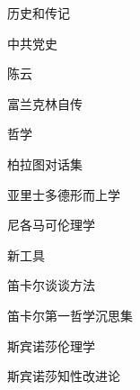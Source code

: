 历史和传记
\begin{enumbox} 
\item 中共党史
\item 陈云
\item 富兰克林自传
\end{enumbox} 

哲学
\begin{enumbox} 
\item 柏拉图对话集
\item 亚里士多德形而上学
\item 尼各马可伦理学
\item 新工具
\item 笛卡尔谈谈方法
\item 笛卡尔第一哲学沉思集
\item 斯宾诺莎伦理学
\item 斯宾诺莎知性改进论
\end{enumbox} 
